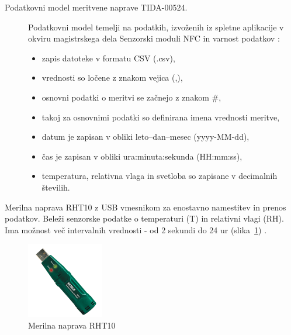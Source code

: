 \documentclass[a4paper, 12pt]{book}
\begin{document}
\begin{description}
\item[Podatkovni model meritvene naprave TIDA-00524.] Podatkovni model temelji na podatkih, izvoženih iz spletne aplikacije v okviru magistrskega dela Senzorski moduli NFC in varnost podatkov \cite{magistrska-crnigoj}:

\begin{itemize}
\item  zapis datoteke v formatu CSV (.csv),
\item  vrednosti so ločene z znakom vejica (,),
\item  osnovni podatki o meritvi se začnejo z znakom \#,
\item  takoj za osnovnimi podatki so definirana imena vrednosti meritve,
\item  datum je zapisan v obliki leto--dan--mesec (yyyy-MM-dd),
\item  čas je zapisan v obliki ura:minuta:sekunda (HH:mm:ss),
\item  temperatura, relativna vlaga in svetloba so zapisane v decimalnih številih.
\end{itemize}
\end{description}


Merilna naprava RHT10 z USB vmesnikom za enostavno namestitev in prenos podatkov. Beleži senzorske podatke o temperaturi (T) in relativni vlagi (RH). 
Ima možnost več intervalnih vrednosti - od 2 sekundi do 24 ur (slika~\ref{merilna-naprava-rht10}) \cite{rht10-dialogger}.

\begin{figure}[h]
\begin{center}
\includegraphics[width=0.3\textwidth]{slike/merilna-naprava-rht10.png}
\end{center}
\caption{Merilna naprava RHT10 \cite{rht10-dialogger}}
\label{merilna-naprava-rht10}
\end{figure}
\end{document}
